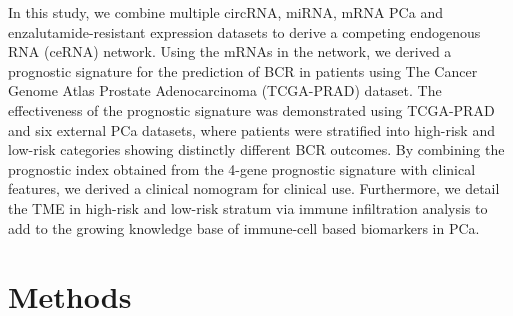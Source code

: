 \documentclass[twocolumn]{bmcart}%
\begin{document}
In this study, we combine multiple circRNA, miRNA, mRNA PCa and enzalutamide-resistant expression datasets to derive a competing endogenous RNA (ceRNA) network. Using the mRNAs in the network, we derived a prognostic signature for the prediction of BCR in patients using The Cancer Genome Atlas Prostate Adenocarcinoma (TCGA-PRAD) dataset. The effectiveness of the prognostic signature was demonstrated using TCGA-PRAD and six external PCa datasets, where patients were stratified into high-risk and low-risk categories showing distinctly different BCR outcomes. By combining the prognostic index obtained from the 4-gene prognostic signature with clinical features, we derived a clinical nomogram for clinical use. Furthermore, we detail the TME in high-risk and low-risk stratum via immune infiltration analysis to add to the growing knowledge base of immune-cell based biomarkers in PCa.  



\section*{Methods}
\end{document}
